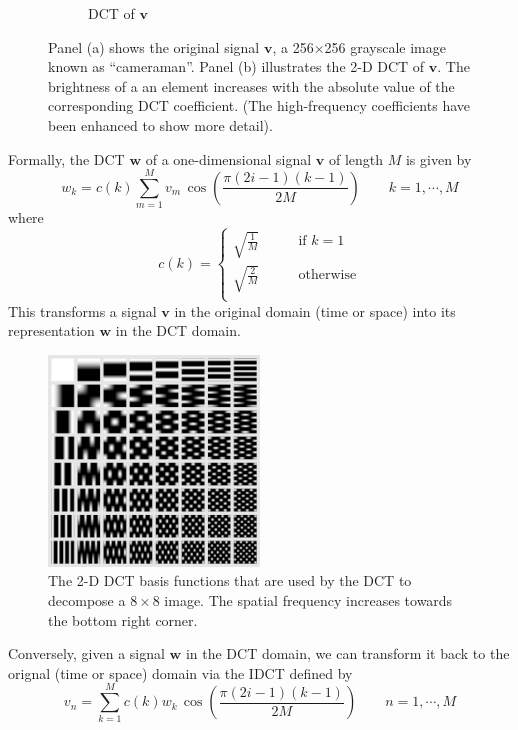 \begin{figure}
\begin{subfigure}{0.45\textwidth}
    \caption{DCT of $\bm v$}
  \end{subfigure}
  \caption{Panel (a) shows the original signal $\bm v$, a 256$\times$256 grayscale image known as ``cameraman''. Panel (b) illustrates the 2-D DCT of $\bm v$. The brightness of a an element increases with the absolute value of the corresponding DCT coefficient. (The high-frequency coefficients have been enhanced to show more detail).}
  \label{fig:ch3:dct}
\end{figure}

Formally, the DCT $\bm w$ of a one-dimensional signal $\bm v$ of length $M$ is given by
\begin{equation}
  w_k = c(k) \sum_{m=1}^{M} v_m \, \cos\left(\frac{\pi(2i-1)(k-1)}{2M}\right) \qquad k = 1,\cdots,M
\end{equation}
where
\begin{equation*}
  c(k) = \left\{\begin{array}{ll}
  \sqrt{\frac{1}{M}} & \qquad\mbox{if $k=1$}\\
  \sqrt{\frac{2}{M}} & \qquad\mbox{otherwise}\\
  \end{array}\right.
\end{equation*}
This transforms a signal $\bm v$ in the original domain (time or space) into its representation $\bm w$ in the DCT domain.

\begin{figure}
  \centering
  \includegraphics[width=0.5\textwidth]{Chapter3/Images/dct2functions.png}
  \caption{The 2-D DCT basis functions that are used by the DCT to decompose a $8\times 8$ image. 
    The spatial frequency increases towards the bottom right corner.}
  \label{fig:2D-DCT}
\end{figure}

Conversely, given a signal $\bm w$ in the DCT domain, we can transform it back to the orignal (time or space) domain via the IDCT defined by
\begin{equation}
  \label{eqn:idct}
  v_n = \sum_{k=1}^M c(k) w_k  \, \cos\left(\frac{\pi(2i-1)(k-1)}{2M}\right) \qquad n = 1,\cdots,M
\end{equation}

